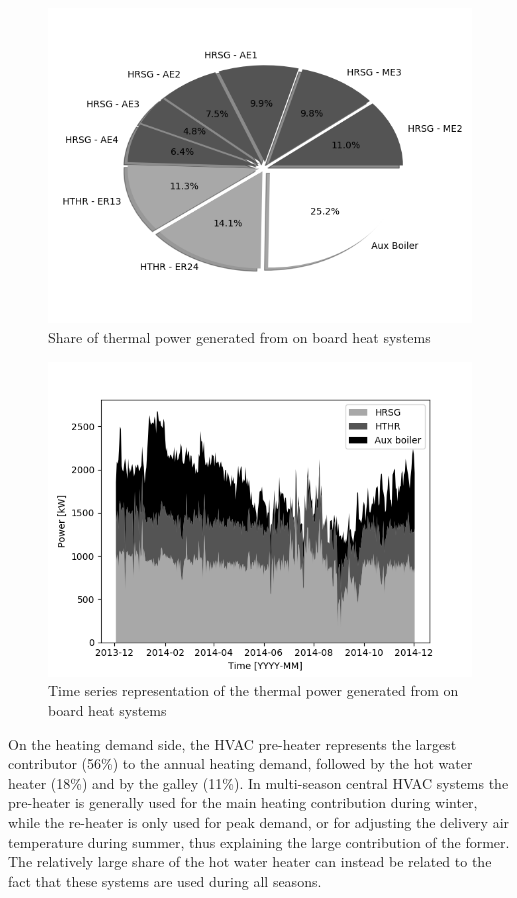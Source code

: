 \documentclass[preprint,12pt]{elsarticle}
\begin{document}
\begin{figure}
	\centering
	\includegraphics[width=0.99\linewidth]{Figures/Pie_HeatGeneration}
	\caption{Share of thermal power generated from on board heat systems}
	\label{fig:Pie_HeatGeneration}
\end{figure}

\begin{figure}
	\centering
	\includegraphics[width=0.99\linewidth]{Figures/TimeSeries_HeatGeneration}
	\caption{Time series representation of the thermal power generated from on board heat systems}
	\label{fig:TimeSeries_HeatGeneration}
\end{figure}


On the heating demand side, the HVAC pre-heater represents the largest contributor (56\%) to the annual heating demand, followed by the hot water heater (18\%) and by the galley (11\%). In multi-season central HVAC systems the pre-heater is generally used for the main heating contribution during winter, while the re-heater is only used for peak demand, or for adjusting the delivery air temperature during summer, thus explaining the large contribution of the former. The relatively large share of the hot water heater can instead be related to the fact that these systems are used during all seasons.
\end{document}
